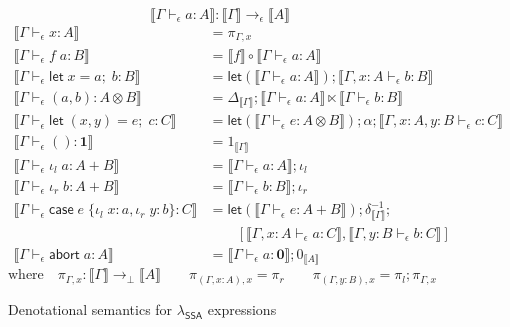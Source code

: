 \documentclass[acmsmall,screen,review]{acmart}
\newcommand{\mb}[1]{\ensuremath{\mathbf{#1}}}
\newcommand{\ms}[1]{\ensuremath{\mathsf{#1}}}
\newcommand{\lto}{:}
\newcommand{\linl}[1]{\iota_l\;{#1}}
\newcommand{\linr}[1]{\iota_r\;{#1}}
\newcommand{\labort}[1]{\ms{abort}\;{#1}}
\newcommand{\letexpr}[3]{\ensuremath{\ms{let}\;#1 = #2;\;#3}}
\newcommand{\caseexpr}[5]{\ms{case}\;#1\;\{\linl{#2} \lto #3, \linr{#4} \lto #5\}}
\newcommand{\bhyp}[2]{#1 : #2}
\newcommand{\hasty}[4]{#1 \vdash_{#2} #3: {#4}}
\newcommand{\dnt}[1]{\llbracket{#1}\rrbracket}
\newcommand{\lmor}[1]{\ms{let}(#1)}
\newcommand{\isotopessa}{\(\lambda_{\ms{SSA}}\)}
\begin{document}
\begin{figure}
  \begin{equation*}
    \boxed{\dnt{\hasty{\Gamma}{\epsilon}{a}{A}} : \dnt{\Gamma} \to_\epsilon \dnt{A}}
  \end{equation*}
  \begin{align*}
    \dnt{\hasty{\Gamma}{\epsilon}{x}{A}} &= \pi_{\Gamma, x} \\
    \dnt{\hasty{\Gamma}{\epsilon}{f\;a}{B}} 
      &= \dnt{f} \circ \dnt{\hasty{\Gamma}{\epsilon}{a}{A}} \\
    \dnt{\hasty{\Gamma}{\epsilon}{\letexpr{x}{a}{b}}{B}}
      &= \lmor{\dnt{\hasty{\Gamma}{\epsilon}{a}{A}}} 
      ; \dnt{\hasty{\Gamma, \bhyp{x}{A}}{\epsilon}{b}{B}}
      \\
    \dnt{\hasty{\Gamma}{\epsilon}{(a, b)}{A \otimes B}} 
      &= \Delta_{\dnt{\Gamma}}
      ; \dnt{\hasty{\Gamma}{\epsilon}{a}{A}} \ltimes \dnt{\hasty{\Gamma}{\epsilon}{b}{B}}
      \\
    \dnt{\hasty{\Gamma}{\epsilon}{\letexpr{(x, y)}{e}{c}}{C}}
      &= \lmor{\dnt{\hasty{\Gamma}{\epsilon}{e}{A \otimes B}}} ; \alpha
      ; \dnt{\hasty{\Gamma, \bhyp{x}{A}, \bhyp{y}{B}}{\epsilon}{c}{C}}
      \\
    \dnt{\hasty{\Gamma}{\epsilon}{()}{\mb{1}}} &= 1_{\dnt{\Gamma}} \\
    \dnt{\hasty{\Gamma}{\epsilon}{\linl{a}}{A + B}}
      &= \dnt{\hasty{\Gamma}{\epsilon}{a}{A}} ; \iota_l \\
    \dnt{\hasty{\Gamma}{\epsilon}{\linr{b}}{A + B}}
      &= \dnt{\hasty{\Gamma}{\epsilon}{b}{B}} ; \iota_r \\
    \dnt{\hasty{\Gamma}{\epsilon}{\caseexpr{e}{x}{a}{y}{b}}{C}}
      &= \lmor{\dnt{\hasty{\Gamma}{\epsilon}{e}{A + B}}}
        ; \delta^{-1}_{\dnt{\Gamma}} ; \\& \qquad
        [
          \dnt{\hasty{\Gamma, \bhyp{x}{A}}{\epsilon}{a}{C}}, 
          \dnt{\hasty{\Gamma, \bhyp{y}{B}}{\epsilon}{b}{C}}
        ]
      \\
    \dnt{\hasty{\Gamma}{\epsilon}{\labort{a}}{A}} 
      &= \dnt{\hasty{\Gamma}{\epsilon}{a}{\mb{0}}} ; 0_{\dnt{A}}
  \end{align*}
  \begin{equation*}
    \text{where} \quad \boxed{\pi_{\Gamma, x} : \dnt{\Gamma} \to_\bot \dnt{A}} \qquad
    \pi_{(\Gamma, x : A), x} = \pi_r \qquad
    \pi_{(\Gamma, y : B), x} = \pi_l ; \pi_{\Gamma, x}
  \end{equation*}
  \caption{Denotational semantics for \isotopessa{} expressions}
  \label{fig:ssa-expr-sem}
\end{figure}
\end{document}
